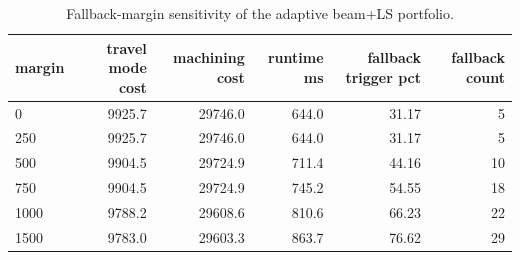 \begin{table}[t]
\centering
\caption{Fallback-margin sensitivity of the adaptive beam+LS portfolio.}
\label{tab:margin-sensitivity-summary}
\begin{tabular}{lrrrrr}
\toprule
margin & travel mode cost & machining cost & runtime ms & fallback trigger pct & fallback count \\
\midrule
0 & 9925.7 & 29746.0 & 644.0 & 31.17 & 5 \\
250 & 9925.7 & 29746.0 & 644.0 & 31.17 & 5 \\
500 & 9904.5 & 29724.9 & 711.4 & 44.16 & 10 \\
750 & 9904.5 & 29724.9 & 745.2 & 54.55 & 18 \\
1000 & 9788.2 & 29608.6 & 810.6 & 66.23 & 22 \\
1500 & 9783.0 & 29603.3 & 863.7 & 76.62 & 29 \\
\bottomrule
\end{tabular}
\end{table}
